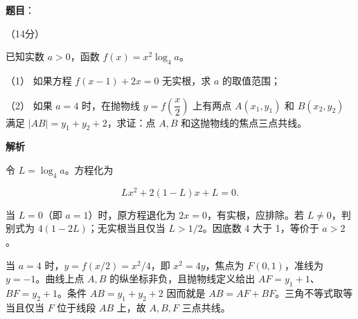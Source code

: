 \begin{answer}

\textbf{题目}：

（14分）

已知实数 $a>0$，函数 $f(x)=x^2\log_4a$。

（1） 如果方程 $f(x-1)+2x=0$ 无实根，求 $a$ 的取值范围；

（2） 如果 $a=4$ 时，在抛物线 $y=f\left(\dfrac x2\right)$ 上有两点 $A(x_1,y_1)$ 和 $B(x_2,y_2)$ 满足 $|AB|=y_1+y_2+2$，求证：点 $A,B$ 和这抛物线的焦点三点共线。

\textbf{解析}


令 $L=\log_4a$。方程化为

\nopagebreak[4]
\[Lx^2+2(1-L)x+L=0.\]

当 $L=0$（即 $a=1$）时，原方程退化为 $2x=0$，有实根，应排除。若 $L\ne0$，判别式为 $4(1-2L)$；无实根当且仅当 $L>1/2$。因底数 4 大于 1，等价于 $a>2$。


当 $a=4$ 时，$y=f(x/2)=x^2/4$，即 $x^2=4y$，焦点为 $F(0,1)$，准线为 $y=-1$。曲线上点 $A,B$ 的纵坐标非负，且抛物线定义给出 $AF=y_1+1$、$BF=y_2+1$。条件 $AB=y_1+y_2+2$ 因而就是 $AB=AF+BF$。三角不等式取等当且仅当 $F$ 位于线段 $AB$ 上，故 $A,B,F$ 三点共线。



\end{answer}
